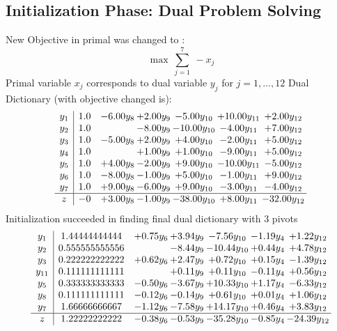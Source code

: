 \documentclass[8pt]{article}
\begin{document}
\subsection{Initialization Phase: Dual Problem Solving}
New Objective in primal was changed to : \[ \max\ \sum_{j=1}^{7}\ - x_j \] 
Primal variable $x_j$ corresponds to dual variable $y_j$ for $j = 1,\ldots,12$
Dual Dictionary (with objective changed is): 
\[\begin{array}{c| c c@{\hskip 2pt} c@{\hskip 2pt} c@{\hskip 2pt} c@{\hskip 2pt} c@{\hskip 2pt} }
 y_{1}   &  1.0 & -6.00 y_{8} & +  2.00 y_{9} & -5.00 y_{10} & + 10.00 y_{11} & +  2.00 y_{12}\\
 y_{2}   &  1.0  &   & -8.00 y_{9} & -10.00 y_{10} & -4.00 y_{11} & +  7.00 y_{12}\\
 y_{3}   &  1.0 & -5.00 y_{8} & +  2.00 y_{9} & +  4.00 y_{10} & -2.00 y_{11} & +  5.00 y_{12}\\
 y_{4}   &  1.0  &   & +  1.00 y_{9} & +  1.00 y_{10} & -9.00 y_{11} & +  5.00 y_{12}\\
 y_{5}   &  1.0 & +  4.00 y_{8} & -2.00 y_{9} & +  9.00 y_{10} & -10.00 y_{11} & -5.00 y_{12}\\
 y_{6}   &  1.0 & -8.00 y_{8} & -1.00 y_{9} & +  5.00 y_{10} & -1.00 y_{11} & +  9.00 y_{12}\\
 y_{7}   &  1.0 & +  9.00 y_{8} & -6.00 y_{9} & +  9.00 y_{10} & -3.00 y_{11} & -4.00 y_{12}\\
\hline
z    &  -0 & +  3.00 y_{8} & -1.00 y_{9} & -38.00 y_{10} & +  8.00 y_{11} & -32.00 y_{12}\\
\end{array}\]
Initialization succeeded in finding final dual dictionary with 3 pivots
\[\begin{array}{c| c c@{\hskip 2pt} c@{\hskip 2pt} c@{\hskip 2pt} c@{\hskip 2pt} c@{\hskip 2pt} }
 y_{1}   &  1.44444444444 & +  0.75 y_{6} & +  3.94 y_{9} & -7.56 y_{10} & -1.19 y_{4} & +  1.22 y_{12}\\
 y_{2}   &  0.555555555556  &   & -8.44 y_{9} & -10.44 y_{10} & +  0.44 y_{4} & +  4.78 y_{12}\\
 y_{3}   &  0.222222222222 & +  0.62 y_{6} & +  2.47 y_{9} & +  0.72 y_{10} & +  0.15 y_{4} & -1.39 y_{12}\\
 y_{11}   &  0.111111111111  &   & +  0.11 y_{9} & +  0.11 y_{10} & -0.11 y_{4} & +  0.56 y_{12}\\
 y_{5}   &  0.333333333333 & -0.50 y_{6} & -3.67 y_{9} & + 10.33 y_{10} & +  1.17 y_{4} & -6.33 y_{12}\\
 y_{8}   &  0.111111111111 & -0.12 y_{6} & -0.14 y_{9} & +  0.61 y_{10} & +  0.01 y_{4} & +  1.06 y_{12}\\
 y_{7}   &  1.66666666667 & -1.12 y_{6} & -7.58 y_{9} & + 14.17 y_{10} & +  0.46 y_{4} & +  3.83 y_{12}\\
\hline
z    &  1.22222222222 & -0.38 y_{6} & -0.53 y_{9} & -35.28 y_{10} & -0.85 y_{4} & -24.39 y_{12}\\
\end{array}\]
\end{document}
